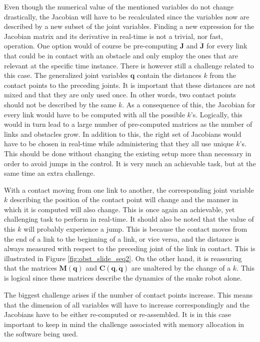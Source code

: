 Even though the numerical value of the mentioned variables do not change drastically, the Jacobian will have to be recalculated since the variables now are described by a new subset of the joint variables. Finding a new expression for the Jacobian matrix and its derivative in real-time is not a trivial, nor fast, operation. One option would of course be pre-computing $\mathbf{J}$ and $\dot{\mathbf{J}}$ for every link that could be in contact with an obstacle and only employ the ones that are relevant at the specific time instance. There is however still a challenge related to this case. The generalized joint variables $\mathbf{q}$ contain the distances $k$ from the contact points to the preceding joints. It is important that these distances are not mixed and that they are only used once. In other words, two contact points should not be described by the same $k$. As a consequence of this, the Jacobian for every link would have to be computed with all the possible $k$'s. Logically, this would in turn lead to a large number of pre-computed matrices as the number of links and obstacles grow. In addition to this, the right set of Jacobians would have to be chosen in real-time while administering that they all use unique $k$'s. This should be done without changing the existing setup more than necessary in order to avoid jumps in the control. It is very much an achievable task, but at the same time an extra challenge.

With a contact moving from one link to another, the corresponding joint variable $k$ describing the position of the contact point will change and the manner in which it is computed will also change. This is once again an achievable, yet challenging task to perform in real-time. It should also be noted that the value of this $k$ will probably experience a jump. This is because the contact moves from the end of a link to the beginning of a link, or vice versa, and the distance is always measured with respect to the preceding joint of the link in contact. This is illustrated in Figure \ref{fig:obst_slide_seq2}. On the other hand, it is reassuring that the matrices $\mathbf{M(q)}$ and $\mathbf{C(q,\dot{q})}$ are unaltered by the change of a $k$. This is logical since these matrices describe the dynamics of the snake robot alone.

The biggest challenge arises if the number of contact points increase. This means that the dimension of all variables will have to increase correspondingly and the Jacobians have to be either re-computed or re-assembled. It is in this case important to keep in mind the challenge associated with memory allocation in the software being used.

